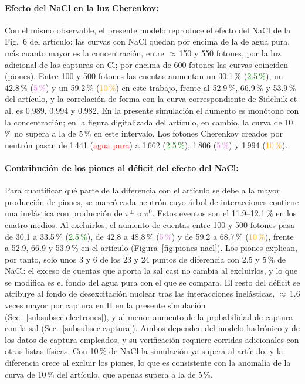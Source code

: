 \paragraph{Efecto del NaCl en la luz Cherenkov:} Con el mismo observable, el presente modelo reproduce el efecto del NaCl de la Fig.~6 del artículo: las curvas con NaCl quedan por encima de la de agua pura, más cuanto mayor es la concentración, entre $\approx$\,150 y 550 fotones, por la luz adicional de las capturas en Cl; por encima de 600 fotones las curvas coinciden (piones). Entre 100 y 500 fotones las cuentas aumentan un 30.1\,\% (\textcolor{green}{2.5\,\%}), un 42.8\,\% (\textcolor{violet}{5\,\%}) y un 59.2\,\% (\textcolor{orange}{10\,\%}) en este trabajo, frente al 52.9\,\%, 66.9\,\% y 53.9\,\% del artículo, y la correlación de forma con la curva correspondiente de Sidelnik et al. es 0.989, 0.994 y 0.982. En la presente simulación el aumento es monótono con la concentración; en la figura digitalizada del artículo, en cambio, la curva de 10\,\% no supera a la de 5\,\% en este intervalo. Los fotones Cherenkov creados por neutrón pasan de 1\,441 (\textcolor{red}{agua pura}) a 1\,662 (\textcolor{green}{2.5\,\%}), 1\,806 (\textcolor{violet}{5\,\%}) y 1\,994 (\textcolor{orange}{10\,\%}).

\paragraph{Contribución de los piones al déficit del efecto del NaCl:} Para cuantificar qué parte de la diferencia con el artículo se debe a la mayor producción de piones, se marcó cada neutrón cuyo árbol de interacciones contiene una inelástica con producción de $\pi^{\pm}$ o $\pi^{0}$. Estos eventos son el 11.9--12.1\,\% en los cuatro medios. Al excluirlos, el aumento de cuentas entre 100 y 500 fotones pasa de 30.1 a 33.5\,\% (\textcolor{green}{2.5\,\%}), de 42.8 a 48.8\,\% (\textcolor{violet}{5\,\%}) y de 59.2 a 68.7\,\% (\textcolor{orange}{10\,\%}), frente a 52.9, 66.9 y 53.9\,\% en el artículo (Figura~\ref{fig:piones-nacl}). Los piones explican, por tanto, solo unos 3 y 6 de los 23 y 24 puntos de diferencia con 2.5 y 5\,\% de NaCl: el exceso de cuentas que aporta la sal casi no cambia al excluirlos, y lo que se modifica es el fondo del agua pura con el que se compara. El resto del déficit se atribuye al fondo de desexcitación nuclear tras las interacciones inelásticas, $\approx$\,1.6 veces mayor por captura en H en la presente simulación (Sec.~\ref{subsubsec:electrones}), y al menor aumento de la probabilidad de captura con la sal (Sec.~\ref{subsubsec:captura}). Ambos dependen del modelo hadrónico y de los datos de captura empleados, y su verificación requiere corridas adicionales con otras listas físicas. Con 10\,\% de NaCl la simulación ya supera al artículo, y la diferencia crece al excluir los piones, lo que es consistente con la anomalía de la curva de 10\,\% del artículo, que apenas supera a la de 5\,\%.

